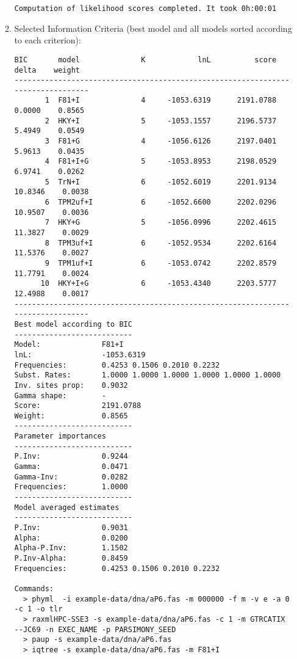 \begin{enumerate}
\begin{enumerate}
\begin{lstlisting}
Computation of likelihood scores completed. It took 0h:00:01
\end{lstlisting}

\item Selected Information Criteria (best model and all models sorted according to each criterion):

\begin{lstlisting}
BIC       model              K            lnL          score          delta    weight
--------------------------------------------------------------------------------
       1  F81+I              4     -1053.6319      2191.0788         0.0000    0.8565
       2  HKY+I              5     -1053.1557      2196.5737         5.4949    0.0549
       3  F81+G              4     -1056.6126      2197.0401         5.9613    0.0435
       4  F81+I+G            5     -1053.8953      2198.0529         6.9741    0.0262
       5  TrN+I              6     -1052.6019      2201.9134        10.8346    0.0038
       6  TPM2uf+I           6     -1052.6600      2202.0296        10.9507    0.0036
       7  HKY+G              5     -1056.0996      2202.4615        11.3827    0.0029
       8  TPM3uf+I           6     -1052.9534      2202.6164        11.5376    0.0027
       9  TPM1uf+I           6     -1053.0742      2202.8579        11.7791    0.0024
      10  HKY+I+G            6     -1053.4340      2203.5777        12.4988    0.0017
--------------------------------------------------------------------------------
Best model according to BIC
---------------------------
Model:              F81+I
lnL:                -1053.6319
Frequencies:        0.4253 0.1506 0.2010 0.2232
Subst. Rates:       1.0000 1.0000 1.0000 1.0000 1.0000 1.0000
Inv. sites prop:    0.9032
Gamma shape:        -
Score:              2191.0788
Weight:             0.8565
---------------------------
Parameter importances
---------------------------
P.Inv:              0.9244
Gamma:              0.0471
Gamma-Inv:          0.0282
Frequencies:        1.0000
---------------------------
Model averaged estimates
---------------------------
P.Inv:              0.9031
Alpha:              0.0200
Alpha-P.Inv:        1.1502
P.Inv-Alpha:        0.8459
Frequencies:        0.4253 0.1506 0.2010 0.2232

Commands:
  > phyml  -i example-data/dna/aP6.fas -m 000000 -f m -v e -a 0 -c 1 -o tlr
  > raxmlHPC-SSE3 -s example-data/dna/aP6.fas -c 1 -m GTRCATIX --JC69 -n EXEC_NAME -p PARSIMONY_SEED
  > paup -s example-data/dna/aP6.fas
  > iqtree -s example-data/dna/aP6.fas -m F81+I
\end{lstlisting}


\end{enumerate}
\end{enumerate}
